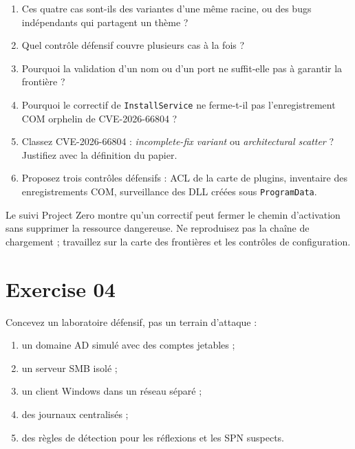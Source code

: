 \documentclass{training}
\begin{document}
\begin{enumerate}
  \item Ces quatre cas sont-ils des variantes d'une même racine, ou des
        bugs indépendants qui partagent un thème ?
  \item Quel contrôle défensif couvre plusieurs cas à la fois ?
  \item Pourquoi la validation d'un nom ou d'un port ne suffit-elle pas à
        garantir la frontière ?
  \item Pourquoi le correctif de \texttt{InstallService} ne ferme-t-il pas
        l'enregistrement COM orphelin de CVE-2026-66804 ?
  \item Classez CVE-2026-66804 : \emph{incomplete-fix variant} ou
        \emph{architectural scatter} ? Justifiez avec la définition du
        papier.
  \item Proposez trois contrôles défensifs : ACL de la carte de plugins,
        inventaire des enregistrements COM, surveillance des DLL créées
        sous \texttt{ProgramData}.
\end{enumerate}

\begin{warn}
Le suivi Project Zero montre qu'un correctif peut fermer le chemin
d'activation sans supprimer la ressource dangereuse. Ne reproduisez pas la
chaîne de chargement ; travaillez sur la carte des frontières et les
contrôles de configuration.
\end{warn}

\chapter{Exercise 04}
\makeheaderfiles

Concevez un laboratoire défensif, pas un terrain d'attaque :

\begin{enumerate}
  \item un domaine AD simulé avec des comptes jetables ;
  \item un serveur SMB isolé ;
  \item un client Windows dans un réseau séparé ;
  \item des journaux centralisés ;
  \item des règles de détection pour les réflexions et les SPN suspects.
\end{enumerate}
\end{document}
